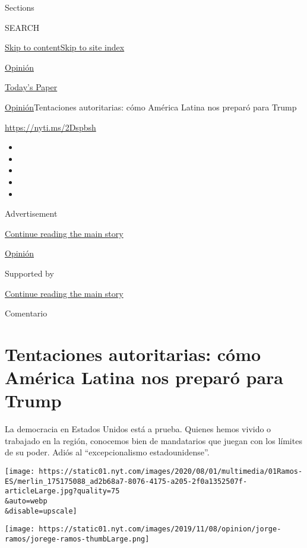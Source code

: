 Sections

SEARCH

\protect\hyperlink{site-content}{Skip to
content}\protect\hyperlink{site-index}{Skip to site index}

\href{https://www.nytimes.com/es/section/opinion}{Opinión}

\href{https://myaccount.nytimes.com/auth/login?response_type=cookie\&client_id=vi}{}

\href{https://www.nytimes.com/section/todayspaper}{Today's Paper}

\href{/es/section/opinion}{Opinión}\textbar{}Tentaciones autoritarias:
cómo América Latina nos preparó para Trump

\url{https://nyti.ms/2Dspbsh}

\begin{itemize}
\item
\item
\item
\item
\item
\end{itemize}

Advertisement

\protect\hyperlink{after-top}{Continue reading the main story}

\href{/es/section/opinion}{Opinión}

Supported by

\protect\hyperlink{after-sponsor}{Continue reading the main story}

Comentario

\hypertarget{tentaciones-autoritarias-cuxf3mo-amuxe9rica-latina-nos-preparuxf3-para-trump}{%
\section{Tentaciones autoritarias: cómo América Latina nos preparó para
Trump}\label{tentaciones-autoritarias-cuxf3mo-amuxe9rica-latina-nos-preparuxf3-para-trump}}

La democracia en Estados Unidos está a prueba. Quienes hemos vivido o
trabajado en la región, conocemos bien de mandatarios que juegan con los
límites de su poder. Adiós al ``excepcionalismo estadounidense''.

\texttt{[image: https://static01.nyt.com/images/2020/08/01/multimedia/01Ramos-ES/merlin\_175175088\_ad2b68a7-8076-4175-a205-2f0a1352507f-articleLarge.jpg?quality=75\\\&auto=webp\\\&disable=upscale]}

\texttt{[image: https://static01.nyt.com/images/2019/11/08/opinion/jorge-ramos/jorege-ramos-thumbLarge.png]}

